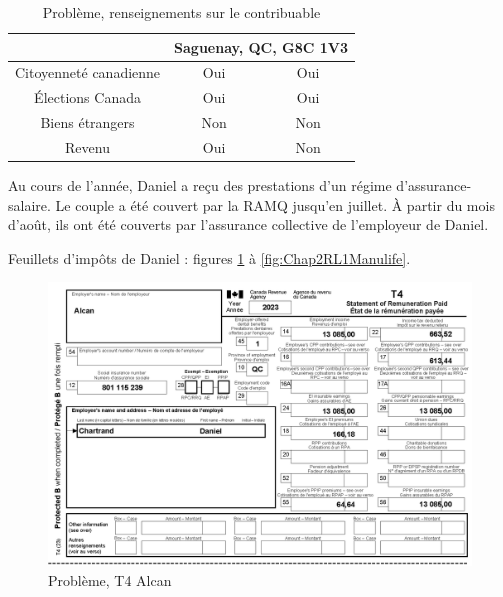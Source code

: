 \begin{table}
\begin{tabular}{|c|c|c|}
		                                 &  \multicolumn{2}{c|}{Saguenay, QC, G8C 1V3}   \\ \hline
		     Citoyenneté canadienne      &           Oui            &        Oui         \\ \hline
		        Élections Canada         &           Oui            &        Oui         \\ \hline
		        Biens étrangers          &           Non            &        Non         \\ \hline
		             Revenu              &           Oui            &        Non         \\ \hline
	\end{tabular}
	\caption{Problème, renseignements sur le contribuable}
	\label{table:pb2}
\end{table}

Au cours de l'année, Daniel a reçu des prestations d'un régime d'assurance-salaire. Le couple a été couvert par la RAMQ jusqu'en juillet. À partir du mois d'août, ils ont été couverts par l'assurance collective de l'employeur de Daniel.

Feuillets d'impôts de Daniel : figures \ref{fig:pb2T4Alcan} à \ref{fig:Chap2RL1Manulife}.

\begin{figure}
	\centering
	\includegraphics[width=.9\textwidth]{probleme/chapitre-2/T4-Alcan.png}
	\caption{Problème, T4 Alcan}
	\label{fig:pb2T4Alcan}
\end{figure}

